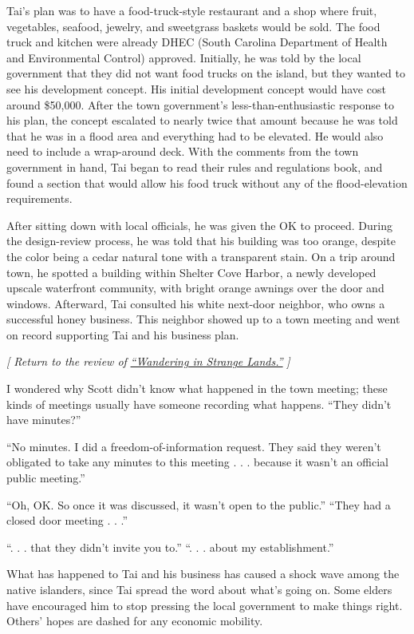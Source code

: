 Tai's plan was to have a food-truck-style restaurant and a shop where
fruit, vegetables, seafood, jewelry, and sweetgrass baskets would be
sold. The food truck and kitchen were already DHEC (South Carolina
Department of Health and Environmental Control) approved. Initially, he
was told by the local government that they did not want food trucks on
the island, but they wanted to see his development concept. His initial
development concept would have cost around \$50,000. After the town
government's less-than-enthusiastic response to his plan, the concept
escalated to nearly twice that amount because he was told that he was in
a flood area and everything had to be elevated. He would also need to
include a wrap-around deck. With the comments from the town government
in hand, Tai began to read their rules and regulations book, and found a
section that would allow his food truck without any of the
flood-elevation requirements.

After sitting down with local officials, he was given the OK to proceed.
During the design-review process, he was told that his building was too
orange, despite the color being a cedar natural tone with a transparent
stain. On a trip around town, he spotted a building within Shelter Cove
Harbor, a newly developed upscale waterfront community, with bright
orange awnings over the door and windows. Afterward, Tai consulted his
white next-door neighbor, who owns a successful honey business. This
neighbor showed up to a town meeting and went on record supporting Tai
and his business plan.

\emph{{[} Return to the review of}
\href{https://www.nytimes.com/2020/08/03/books/review/wandering-in-strange-lands-morgan-jerkins.html}{\emph{``Wandering
in Strange Lands.''}} \emph{{]}}

I wondered why Scott didn't know what happened in the town meeting;
these kinds of meetings usually have someone recording what happens.
``They didn't have minutes?''

``No minutes. I did a freedom-of-information request. They said they
weren't obligated to take any minutes to this meeting . . . because it
wasn't an official public meeting.''

``Oh, OK. So once it was discussed, it wasn't open to the public.''
``They had a closed door meeting . . .''

``. . . that they didn't invite you to.'' ``. . . about my
establishment.''

What has happened to Tai and his business has caused a shock wave among
the native islanders, since Tai spread the word about what's going on.
Some elders have encouraged him to stop pressing the local government to
make things right. Others' hopes are dashed for any economic mobility.


